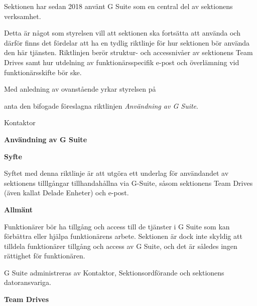 \documentclass[../_main/handlingar.tex]{subfiles}
\begin{document}

Sektionen har sedan 2018 använt G Suite som en central del av sektionens verksamhet. 

Detta är något som styrelsen vill att sektionen ska fortsätta att använda och därför finns det fördelar att ha en tydlig riktlinje för hur sektionen bör använda den här tjänsten. Riktlinjen berör struktur- och accessnivåer av sektionens Team Drives samt hur utdelning av funktionärsspecifik e-post och överlämning vid funktionärsskifte bör ske. 

\vspace{10px}

Med anledning av ovanstående yrkar styrelsen på

\begin{attsatser}
    
    \att anta den bifogade föreslagna riktlinjen \textit{Användning av G Suite}. 

\end{attsatser}

\begin{signatures}{1}
    \ist
    \signature{Mattias Lundström}{Kontaktor}
\end{signatures}

{\Large \textbf{Användning av G Suite}}
    \vspace{4px}

    {\large \textbf{Syfte}}
    \vspace{4px}
    
    Syftet med denna riktlinje är att utgöra ett underlag för användandet av sektionens tilllgångar tillhandahållna via G-Suite, såsom sektionens Team Drives (även kallat Delade Enheter) och e-post. 
    
    \vspace{4px}
    {\large \textbf{Allmänt}}
    \vspace{4px}

    Funktionärer bör ha tillgång och access till de tjänster i G Suite som kan förbättra eller hjälpa funktionärens arbete. 
    Sektionen är dock inte skyldig att tilldela funktionärer tillgång och access av G Suite, och det är således ingen rättighet för funktionären. 
 
    G Suite administreras av Kontaktor, Sektionsordförande och sektionens datoransvariga. 
    
    \vspace{4px}
    {\large \textbf{Team Drives}}
    \vspace{4px}
\end{document}
